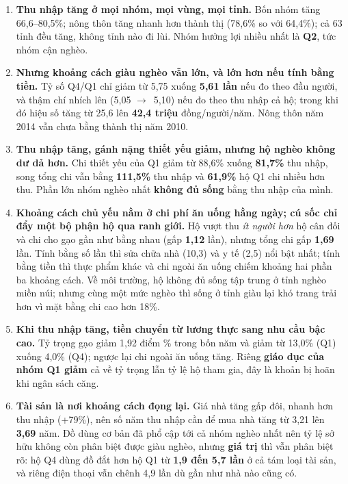 \documentclass[11pt,a4paper]{article}
\newcommand{\ra}{$\rightarrow$}
\newcommand{\n}[1]{\textbf{#1}}
\begin{document}
\begin{enumerate}[leftmargin=1.5em,itemsep=6pt,topsep=3pt]
\item \n{Thu nhập tăng ở mọi nhóm, mọi vùng, mọi tỉnh.} Bốn nhóm tăng 66,6–80,5\%; nông thôn tăng nhanh hơn thành thị (78,6\% so với 64,4\%); cả 63 tỉnh đều tăng, không tỉnh nào đi lùi. Nhóm hưởng lợi nhiều nhất là \n{Q2}, tức nhóm cận nghèo.

\item \n{Nhưng khoảng cách giàu nghèo vẫn lớn, và lớn hơn nếu tính bằng tiền.} Tỷ số Q4/Q1 chỉ giảm từ 5,75 xuống \n{5,61 lần} nếu đo theo đầu người, và thậm chí nhích lên (5,05 \ra\ 5,10) nếu đo theo thu nhập cả hộ; trong khi đó hiệu số tăng từ 25,6 lên \n{42,4 triệu} đồng/người/năm. Nông thôn năm 2014 vẫn chưa bằng thành thị năm 2010.

\item \n{Thu nhập tăng, gánh nặng thiết yếu giảm, nhưng hộ nghèo không dư dả hơn.} Chi thiết yếu của Q1 giảm từ 88,6\% xuống \n{81,7\%} thu nhập, song tổng chi vẫn bằng \n{111,5\%} thu nhập và \n{61,9\%} hộ Q1 chi nhiều hơn thu. Phần lớn nhóm nghèo nhất \n{không đủ sống} bằng thu nhập của mình.

\item \n{Khoảng cách chủ yếu nằm ở chi phí ăn uống hằng ngày; cú sốc chỉ đẩy một bộ phận hộ qua ranh giới.} Hộ vượt thu \emph{ít người hơn} hộ cân đối và chi cho gạo gần như bằng nhau (gấp \n{1,12} lần), nhưng tổng chi gấp \n{1,69} lần. Tính bằng số lần thì sửa chữa nhà (10,3) và y tế (2,5) nổi bật nhất; tính bằng tiền thì thực phẩm khác và chi ngoài ăn uống chiếm khoảng hai phần ba khoảng cách. Về môi trường, hộ không đủ sống tập trung ở tỉnh nghèo miền núi; nhưng cùng một mức nghèo thì sống ở tỉnh giàu lại khó trang trải hơn vì mặt bằng chi cao hơn 18\%.

\item \n{Khi thu nhập tăng, tiền chuyển từ lương thực sang nhu cầu bậc cao.} Tỷ trọng gạo giảm 1,92 điểm \% trong bốn năm và giảm từ 13,0\% (Q1) xuống 4,0\% (Q4); ngược lại chi ngoài ăn uống tăng. Riêng \n{giáo dục của nhóm Q1 giảm} cả về tỷ trọng lẫn tỷ lệ hộ tham gia, đây là khoản bị hoãn khi ngân sách căng.

\item \n{Tài sản là nơi khoảng cách đọng lại.} Giá nhà tăng gấp đôi, nhanh hơn thu nhập (+79\%), nên số năm thu nhập cần để mua nhà tăng từ 3,21 lên \n{3,69} năm. Đồ dùng cơ bản đã phổ cập tới cả nhóm nghèo nhất nên tỷ lệ sở hữu không còn phân biệt được giàu nghèo, nhưng \n{giá trị} thì vẫn phân biệt rõ: hộ Q4 dùng đồ đắt hơn hộ Q1 từ \n{1,9 đến 5,7 lần} ở cả tám loại tài sản, và riêng điện thoại vẫn chênh 4,9 lần dù gần như nhà nào cũng có.
\end{enumerate}
\end{document}
